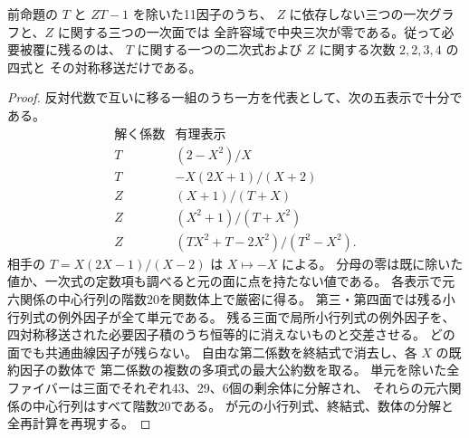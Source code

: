\begin{corollary}\label{cor:cubic-CY-one-segre-square-split-M-simple-surfaces}
前命題の $T$ と $ZT-1$ を除いた11因子のうち、
$Z$ に依存しない三つの一次グラフと、$Z$ に関する三つの一次面では
全許容域で中央三次が零である。従って必要被覆に残るのは、
$T$ に関する一つの二次式および $Z$ に関する次数 $2,2,3,4$ の四式と
その対称移送だけである。
\end{corollary}
\begin{proof}
反対代数で互いに移る一組のうち一方を代表として、次の五表示で十分である。
\[
\begin{array}{c|c}
\text{解く係数}&\text{有理表示}\\ \hline
 T&(2-X^2)/X\\
 T&-X(2X+1)/(X+2)\\
 Z&(X+1)/(T+X)\\
 Z&(X^2+1)/(T+X^2)\\
 Z&(TX^2+T-2X^2)/(T^2-X^2).
\end{array}
\]
相手の $T=X(2X-1)/(X-2)$ は $X\mapsto-X$ による。
分母の零は既に除いた値か、一次式の定数項も調べると元の面に点を持たない値である。
各表示で元六関係の中心行列の階数20を関数体上で厳密に得る。
第三・第四面では残る小行列式の例外因子が全て単元である。
残る三面で局所小行列式の例外因子を、
四対称移送された必要因子積のうち恒等的に消えないものと交差させる。
どの面でも共通曲線因子が残らない。
自由な第二係数を終結式で消去し、各 $X$ の既約因子の数体で
第二係数の複数の多項式の最大公約数を取る。
単元を除いた全ファイバーは三面でそれぞれ43、29、6個の剰余体に分解され、
それらの元六関係の中心行列はすべて階数20である。
が元の小行列式、終結式、数体の分解と全再計算を再現する。
\end{proof}

